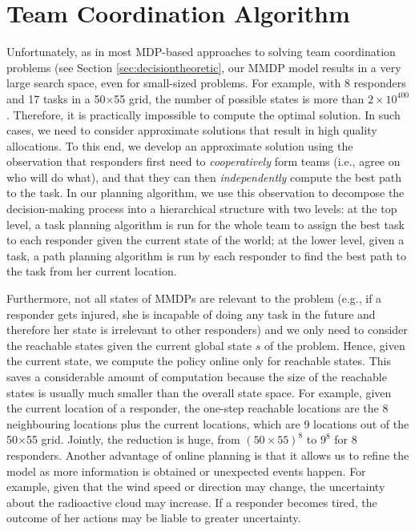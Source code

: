 \section{Team Coordination Algorithm}\label{sec:algo}
\noindent Unfortunately, as in most MDP-based approaches to solving team coordination problems (see Section \ref{sec:decisiontheoretic}, our  MMDP model results in a very large search space,
even for small-sized problems. For example, with 8 responders and
17 tasks in a 50$\times$55 grid, the number of possible states is
more than $2\times 10^{400}$. Therefore, it is practically
impossible to compute the optimal solution. In such cases, we need
to consider approximate solutions that result in high quality
allocations.  To this end, we develop an
approximate solution using  the observation that responders first need to {\em cooperatively}  form teams (i.e., agree on who will do what),
and  that they can then {\em independently} compute the best path to the task.
In our planning algorithm, we use this observation to decompose the
decision-making process into a hierarchical structure with two
levels: at the top level, a task planning algorithm is run for the
whole team to assign the best task to each responder given the
current state of the world; at the lower level, given a task, a
path planning algorithm is run by each responder to find the best
path to the task from her current location.

Furthermore, not all states of MMDPs are relevant to the problem
(e.g., if a responder gets injured, she is incapable of doing any
task in the future and therefore her state is irrelevant
to other responders) and we only need to consider the reachable
states given the current global state $s$ of the problem. Hence,
given the current state, we compute the policy online only for
reachable states. This saves a considerable amount of computation
because the size of the reachable states is usually much smaller
than the overall state space. For example, given the current
location of a responder, the one-step reachable locations are the 8
neighbouring locations plus the current locations, which are 9
locations out of the 50$\times$55 grid. Jointly, the reduction is
huge, from $(50\times 55)^8$ to $9^8$ for 8 responders. Another
advantage of online planning is that it allows us to refine the
model as more information is obtained or unexpected events happen.
For example, given that the wind speed or  direction 
 may change, the uncertainty about the radioactive cloud may increase.
If a responder becomes tired, the outcome of  her actions may
be liable to greater uncertainty.

